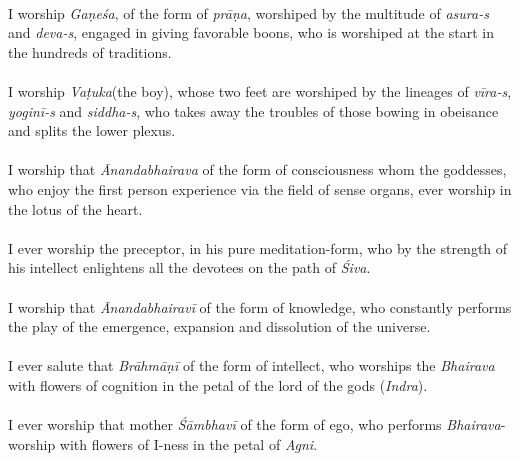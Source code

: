 \documentclass[12pt]{article}
\begin{document}
{}\\
I worship \textit{Gaṇeśa}, of the form of \textit{prāṇa}, worshiped by the multitude of \textit{asura-s} and \textit{deva-s}, engaged in giving favorable boons, who is worshiped at the start in the hundreds of traditions.\\

{}\\
I worship \textit{Vaṭuka}(the boy), whose two feet are worshiped by the lineages of \textit{vīra-s}, \textit{yoginī-s} and \textit{siddha-s}, who takes away the troubles of those bowing in obeisance and splits the lower plexus.\\

{}\\
I worship that \textit{Ānandabhairava} of the form of consciousness whom the goddesses, who enjoy the first person experience via the field of sense organs, ever worship in the lotus of the heart.\\

{}\\
I ever worship the preceptor, in his pure meditation-form, who by the strength of his intellect enlightens all the devotees on the path of \textit{Śiva}.\\

{}\\
I worship that \textit{Ānandabhairavī} of the form of knowledge, who constantly performs the play of the emergence, expansion and dissolution of the universe.\\

{}\\
I ever salute that \textit{Brāhmāṇī} of the form of intellect, who worships the \textit{Bhairava} with flowers of cognition in the petal of the lord of the gods (\textit{Indra}).\\
\newpage
{}\\
I ever worship that mother \textit{Śāmbhavī} of the form of ego, who performs \textit{Bhairava}-worship with flowers of I-ness in the petal of \textit{Agni}.\\
\end{document}
